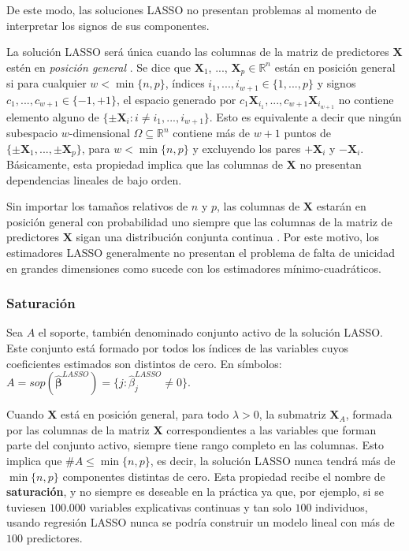 \documentclass[a4paper,12pt]{report}
\begin{document}
De este modo, las soluciones LASSO no presentan problemas al momento de interpretar los signos de sus componentes.

La solución LASSO será única cuando las columnas de la matriz de predictores $\boldsymbol{X}$ estén en \textit{posición general} \citep{tibshirani2013lasso}. Se dice que $\boldsymbol{X}_1$, ..., $\boldsymbol{X}_p \in \mathbb{R}^n$ están en posición general si para cualquier $w < \min\{n,p\}$, índices $i_1, ..., i_{w+1} \in \{1, ..., p\}$ y signos $c_1, ..., c_{w+1} \in \{-1, +1\}$, el espacio generado por $c_1\boldsymbol{X}_{i_1}, ..., c_{w+1}\boldsymbol{X}_{i_{w+1}}$ no contiene elemento alguno de ${\{\pm \boldsymbol{X}_i:i\neq i_1, ..., i_{w+1}\}}$. Esto es equivalente a decir que ningún subespacio ${w\text{-dimensional}}$ $\Omega \subseteq \mathbb{R}^n$ contiene más de $w+1$ puntos de $\{\pm \boldsymbol{X}_1, ..., \pm \boldsymbol{X}_p\}$, para $w<\min \{n,p\}$ y excluyendo los pares $+\boldsymbol{X}_i$ y $-\boldsymbol{X}_i$. Básicamente, esta propiedad implica que las columnas de $\boldsymbol{X}$ no presentan dependencias lineales de bajo orden.

Sin importar los tamaños relativos de $n$ y $p$, las columnas de $\boldsymbol{X}$ estarán en posición general con probabilidad uno siempre que las columnas de la matriz de predictores $\boldsymbol{X}$ sigan una distribución conjunta continua \citep{tibshirani2013lasso}. Por este motivo, los estimadores LASSO generalmente no presentan el problema de falta de unicidad en grandes dimensiones como sucede con los estimadores mínimo-cuadráticos.

\subsubsection*{Saturación}
Sea $A$ el soporte, también denominado conjunto activo de la solución LASSO. Este conjunto está formado por todos los índices de las variables cuyos coeficientes estimados son distintos de cero. En símbolos: $A=sop\left(\boldsymbol{\hat{\beta}}^{LASSO}\right)=\{j:\hat{\beta}_j^{LASSO} \neq 0\}$.

Cuando $\boldsymbol{X}$ está en posición general, para todo $\lambda > 0$, la submatriz $\boldsymbol{X}_A$, formada por las columnas de la matriz $\boldsymbol{X}$ correspondientes a las variables que forman parte del conjunto activo, siempre tiene rango completo en las columnas. Esto implica que $\#A \leq \min \{n,p\}$, es decir, la solución LASSO nunca tendrá más de $\min \{n,p\}$ componentes distintas de cero. Esta propiedad recibe el nombre de \textbf{saturación}, y no siempre es deseable en la práctica ya que, por ejemplo, si se tuviesen $100$.$000$ variables explicativas continuas y tan solo $100$ individuos, usando regresión LASSO nunca se podría construir un modelo lineal con más de $100$ predictores.
\end{document}

